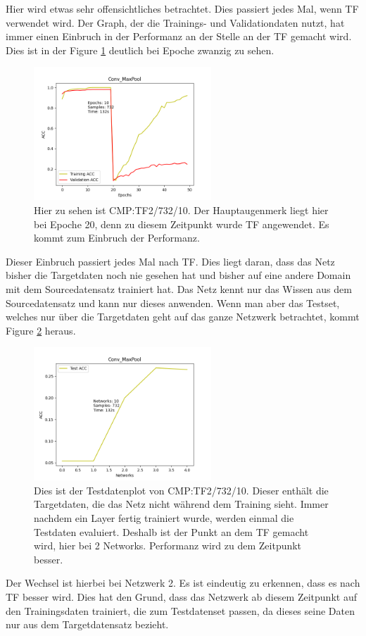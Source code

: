 Hier wird etwas sehr offensichtliches betrachtet. Dies passiert jedes Mal, wenn TF verwendet wird. 
Der Graph, der die Trainings- und Validationdaten nutzt, hat immer einen Einbruch in der Performanz an der Stelle an 
der TF gemacht wird. Dies ist in der Figure \ref{fig:convmaxpooltrain} deutlich bei Epoche zwanzig zu sehen.

\begin{figure}[htpb]
    \centering
    \includegraphics[height=5cm]{../../Plots/ba_plots/convmaxpool/convmaxpooltrain.png}
    \caption{\label{fig:convmaxpooltrain} 
    \small{Hier zu sehen ist CMP:TF2/732/10. Der Hauptaugenmerk liegt hier bei Epoche 20, denn zu diesem Zeitpunkt wurde TF angewendet. 
    Es kommt zum Einbruch der Performanz.}}
\end{figure}

Dieser Einbruch passiert jedes Mal nach TF. Dies liegt daran, dass das Netz bisher die Targetdaten noch nie gesehen hat und bisher 
auf eine andere Domain mit dem Sourcedatensatz trainiert hat. Das Netz kennt nur das Wissen aus dem Sourcedatensatz und kann nur dieses 
anwenden. Wenn man aber das Testset, welches nur über die Targetdaten geht auf das ganze Netzwerk betrachtet, kommt Figure \ref{fig:convmaxpooltest} heraus. 

\begin{figure}[htpb]
    \centering
    \includegraphics[height=5cm]{../../Plots/ba_plots/convmaxpool/convmaxpooltest.png}
    \caption{\label{fig:convmaxpooltest} 
    \small{Dies ist der Testdatenplot von CMP:TF2/732/10. Dieser enthält die Targetdaten, die das Netz nicht 
    während dem Training sieht. Immer nachdem ein Layer fertig trainiert wurde, werden einmal die Testdaten evaluiert. Deshalb ist der Punkt 
    an dem TF gemacht wird, hier bei 2 Networks. Performanz wird zu dem Zeitpunkt besser.}}
\end{figure}

Der Wechsel ist hierbei bei Netzwerk 2. Es ist eindeutig zu erkennen, dass es nach TF besser wird. Dies hat den Grund, dass das Netzwerk 
ab diesem Zeitpunkt auf den Trainingsdaten trainiert, die zum Testdatenset passen, da dieses seine Daten nur aus dem Targetdatensatz bezieht. 
